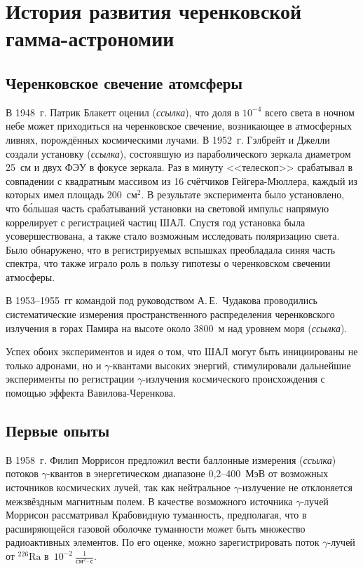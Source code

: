 \documentclass[magd,floatypics,numeref]{msudipl} %
\begin{document}
\section{История развития черенковской гамма-астрономии}
\subsection{Черенковское свечение атомсферы}
В 1948~г. Патрик Блакетт оценил (\textit{ссылка}), что доля в $10^{-4}$ всего света в ночном небе может приходиться на черенковское свечение, возникающее в атмосферных ливнях, порождённых космическими лучами. В 1952~г. Гэлбрейт и Джелли создали установку (\textit{ссылка}), состоявшую из параболического зеркала диаметром 25~см и двух ФЭУ в фокусе зеркала. Раз в минуту <<телескоп>> срабатывал в совпадении с квадратным массивом из 16 счётчиков Гейгера-Мюллера, каждый из которых имел площадь 200~$\text{см}^2$. В результате эксперимента было установлено, что б\'ольшая часть срабатываний установки на световой импульс напрямую коррелирует с регистрацией частиц ШАЛ. Спустя год установка была усовершествована, а также стало возможным исследовать поляризацию света. Было обнаружено, что в регистрируемых вспышках преобладала синяя часть спектра, что также играло роль в пользу гипотезы о черенковском свечении атмосферы.  

В 1953--1955~гг командой под руководством А.\,Е.~Чудакова проводились систематические измерения пространственного распределения черенковского излучения в горах Памира на высоте около 3800~м над уровнем моря (\textit{ссылка}).

Успех обоих экспериментов и идея о том, что ШАЛ могут быть инициированы не только адронами, но и $\gamma$-квантами высоких энергий, стимулировали дальнейшие эксперименты по регистрации $\gamma$-излучения космического происхождения с помощью эффекта Вавилова-Черенкова. 
\subsection{Первые опыты}
В 1958~г. Филип Моррисон предложил вести баллонные измерения  (\textit{ссылка}) потоков $\gamma$-квантов в энергетическом диапазоне 0,2--400~МэВ от возможных источников космических лучей, так как нейтральное  $\gamma$-излучение не отклоняется межзвёздным магнитным полем. В качестве возможного источника $\gamma$-лучей Моррисон рассматривал Крабовидную туманность, предполагая, что в расширяющейся газовой оболочке туманности может быть множество радиоактивных элементов. По его оценке, можно зарегистрировать поток $\gamma$-лучей от $^{226}\text{Ra}$ в~$10^{-2}~\frac{1}{\text{см}^2\cdot\text{с}}$.
\end{document}

